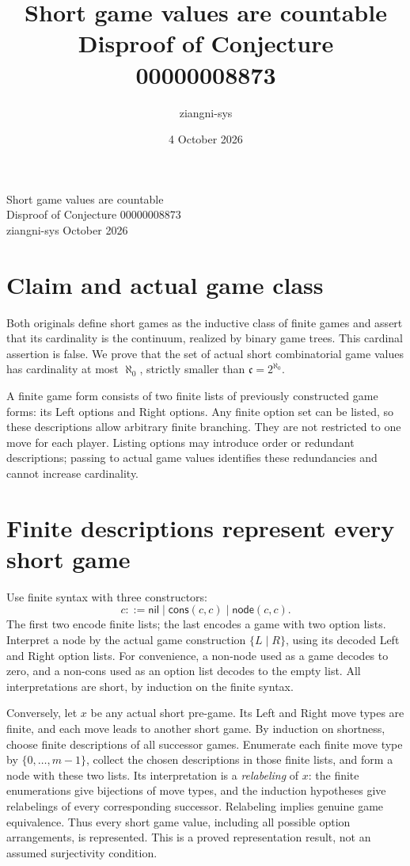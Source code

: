 \documentclass[10pt,a4paper]{article}
\title{Short game values are countable\\\large Disproof of Conjecture 00000008873}
\author{ziangni-sys}
\date{4 October 2026}
\begin{document}
\begin{center}
{\Large Short game values are countable}\\[4pt]
{\large Disproof of Conjecture 00000008873}\\[6pt]
ziangni-sys  October 2026
\end{center}
\section*{Claim and actual game class}
Both originals define short games as the inductive class of finite games
and assert that its cardinality is the continuum, realized by binary
game trees. This cardinal assertion is false. We prove that the set of
actual short combinatorial game values has cardinality at most
$\aleph_0$, strictly smaller than $\mathfrak c=2^{\aleph_0}$.

A finite game form consists of two finite lists of previously constructed
game forms: its Left options and Right options. Any finite option set
can be listed, so these descriptions allow arbitrary finite branching.
They are not restricted to one move for each player. Listing options
may introduce order or redundant descriptions; passing to actual game
values identifies these redundancies and cannot increase cardinality.

\section*{Finite descriptions represent every short game}
Use finite syntax with three constructors:
\[
 c ::= \mathsf{nil}\mid\mathsf{cons}(c,c)\mid\mathsf{node}(c,c).
\]
The first two encode finite lists; the last encodes a game with two
option lists. Interpret a node by the actual game construction
$\{L\mid R\}$, using its decoded Left and Right option lists.
For convenience, a non-node used as a game decodes to zero, and a
non-cons used as an option list decodes to the empty list.
All interpretations are short, by induction on the finite syntax.

Conversely, let $x$ be any actual short pre-game. Its Left and Right
move types are finite, and each move leads to another short game.
By induction on shortness, choose finite descriptions of all successor
games. Enumerate each finite move type by
$\{0,\ldots,m-1\}$, collect the chosen descriptions in those finite
lists, and form a node with these two lists. Its interpretation is a
\emph{relabeling} of $x$: the finite enumerations give bijections of
move types, and the induction hypotheses give relabelings of every
corresponding successor. Relabeling implies genuine game equivalence.
Thus every short game value, including all possible option arrangements,
is represented. This is a proved representation result, not an assumed
surjectivity condition.
\end{document}
